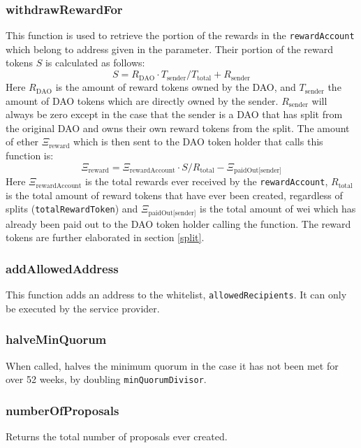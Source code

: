 \documentclass[9pt,oneside]{amsart}
\begin{document}
\begin{multicols}{2}
\subsubsection*{withdrawRewardFor}
This function is used to retrieve the portion of the rewards in the \verb|rewardAccount| which belong to address given in the parameter.
Their portion of the reward tokens $S$ is calculated as follows:
\begin{equation}
 S = R_{\text{DAO}} \cdot T_{\text{sender}} / T_{\text{total}} + R_{\text{sender}}
\end{equation}
Here $R_{\text{DAO}}$ is the amount of reward tokens owned by the DAO, and $T_{\text{sender}}$ the amount of DAO tokens which are directly owned by the sender. $R_{\text{sender}}$ will always be zero except in the case that the sender is a DAO that has split from the original DAO and owns their own reward tokens from the split.
The amount of ether $\Xi_{\text{reward}}$ which is then sent to the DAO token holder that calls this function is:
\begin{equation}
\Xi_{\text{reward}} = \Xi_{\text{rewardAccount}} \cdot S / R_{\text{total}} - \Xi_{\text{paidOut[sender]}}
\end{equation}
Here $\Xi_{\text{rewardAccount}}$ is the total rewards ever received by the \verb|rewardAccount|, $R_{\text{total}}$ is the total amount of reward tokens that have ever been created, regardless of splits (\verb|totalRewardToken|) and $\Xi_{\text{paidOut[sender]}}$ is the total amount of wei which has already been paid out to the DAO token holder calling the function. The reward tokens are further elaborated in section \ref{split}.
\subsubsection*{addAllowedAddress}
This function adds an address to the whitelist, \verb|allowedRecipients|. It can only be executed by the service provider.

\subsubsection*{halveMinQuorum}
When called, halves the minimum quorum in the case it has not been met for over 52 weeks, by doubling \verb|minQuorumDivisor|.

\subsubsection*{numberOfProposals}
Returns the total number of proposals ever created.


\end{multicols}
\end{document}
